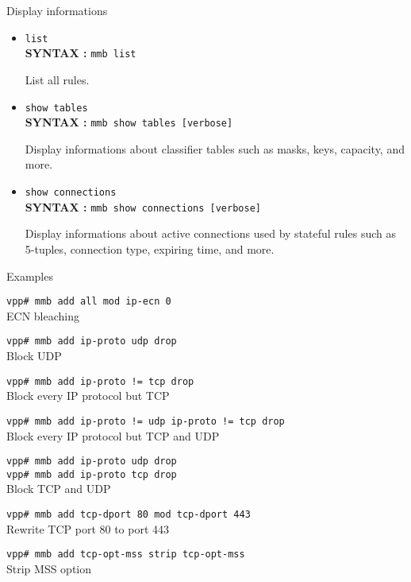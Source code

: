 \documentclass[a4paper,twoside,11pt]{report}
\makeatletter
\renewcommand{\chapter}{\@startsection{chapter}{0}{0mm}
  {\baselineskip}%
  {\baselineskip}{\clearpage\LARGE\bf\color{black}}}
\renewcommand{\section}{\@startsection{section}{1}{0mm}
  {\baselineskip}%
  {\baselineskip}{\LARGE\color{black}}}%
\makeatother
\begin{document}
\section{Display informations}

 \begin{itemize}
   \item \texttt{list}\\
         \textbf{SYNTAX :} \texttt{mmb list}

         List all rules.
   \item \texttt{show tables}\\
         \textbf{SYNTAX :} \texttt{mmb show tables [verbose]}

         Display informations about classifier tables such as masks, keys,
         capacity, and more.
   \item \texttt{show connections}\\
         \textbf{SYNTAX :} \texttt{mmb show connections [verbose]}

         Display informations about active connections used by stateful rules
         such as 5-tuples, connection type, expiring time, and more.
 \end{itemize}

\chapter{Examples}

\texttt{vpp\# mmb add all mod ip-ecn 0} \\
   ECN bleaching

\texttt{vpp\# mmb add ip-proto udp drop} \\
   Block UDP

\texttt{vpp\# mmb add ip-proto != tcp drop} \\
   Block every IP protocol but TCP

\texttt{vpp\# mmb add ip-proto != udp ip-proto != tcp drop} \\
   Block every IP protocol but TCP and UDP

\texttt{vpp\# mmb add ip-proto udp drop} \\
\texttt{vpp\# mmb add ip-proto tcp drop} \\
   Block TCP and UDP

\texttt{vpp\# mmb add tcp-dport 80 mod tcp-dport 443} \\
   Rewrite TCP port 80 to port 443

\texttt{vpp\# mmb add tcp-opt-mss strip tcp-opt-mss} \\
   Strip MSS option
\end{document}
